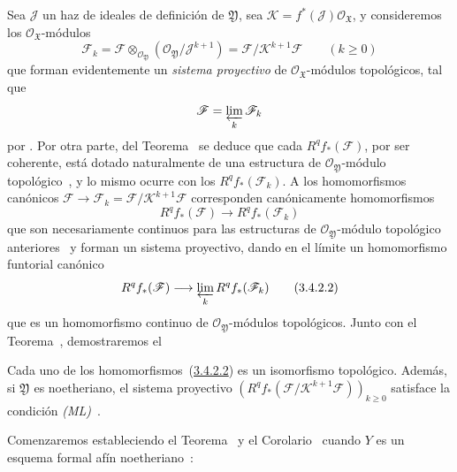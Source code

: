 Sea $\mathcal J$ un haz de ideales de definición de $\mathfrak Y$, sea $\mathcal K=f^*(\mathcal J)\mathcal O_{\mathfrak X}$, y consideremos los $\mathcal O_{\mathfrak X}$-módulos
\[
\mathcal F_k=\mathcal F\otimes_{\mathcal O_{\mathfrak Y}}
(\mathcal O_{\mathfrak Y}/\mathcal J^{k+1})
=\mathcal F/\mathcal K^{k+1}\mathcal F\qquad(k\geq0)
\tag{3.4.2.1}\label{III.3.4.2.1-fr}
\]
que forman evidentemente un \emph{sistema proyectivo} de $\mathcal O_{\mathfrak X}$-módulos topológicos, tal que
\[
\mathcal F=\varprojlim_k\mathcal F_k
\]
por .
Por otra parte, del Teorema~ se deduce que cada $R^qf_*(\mathcal F)$, por ser coherente, está dotado naturalmente de una estructura de $\mathcal O_{\mathfrak Y}$-módulo topológico~, y lo mismo ocurre con los $R^qf_*(\mathcal F_k)$.
A los homomorfismos canónicos $\mathcal F\to\mathcal F_k=\mathcal F/\mathcal K^{k+1}\mathcal F$ corresponden canónicamente homomorfismos
\[
R^qf_*(\mathcal F)\longrightarrow R^qf_*(\mathcal F_k)
\]
que son necesariamente continuos para las estructuras de $\mathcal O_{\mathfrak Y}$-módulo topológico anteriores~ y forman un sistema proyectivo, dando en el límite un homomorfismo funtorial canónico
\[
R^qf_*(\mathcal F)\longrightarrow\varprojlim_kR^qf_*(\mathcal F_k)
\tag{3.4.2.2}\label{III.3.4.2.2-fr}
\]
que es un homomorfismo continuo de $\mathcal O_{\mathfrak Y}$-módulos topológicos.
Junto con el Teorema~, demostraremos el
\begin{corollary}[3.4.3]
\label{III.3.4.3}
\label{III.3.4.3-fr}
Cada uno de los homomorfismos~(\hyperref[III.3.4.2.2]{3.4.2.2}) es un isomorfismo topológico.
Además, si $\mathfrak Y$ es noetheriano, el sistema proyectivo $(R^qf_*(\mathcal F/\mathcal K^{k+1}\mathcal F))_{k\geq0}$ satisface la condición \emph{(ML)}~.
\end{corollary}
Comenzaremos estableciendo el Teorema~ y el Corolario~ cuando $Y$ es un esquema formal afín noetheriano~:

